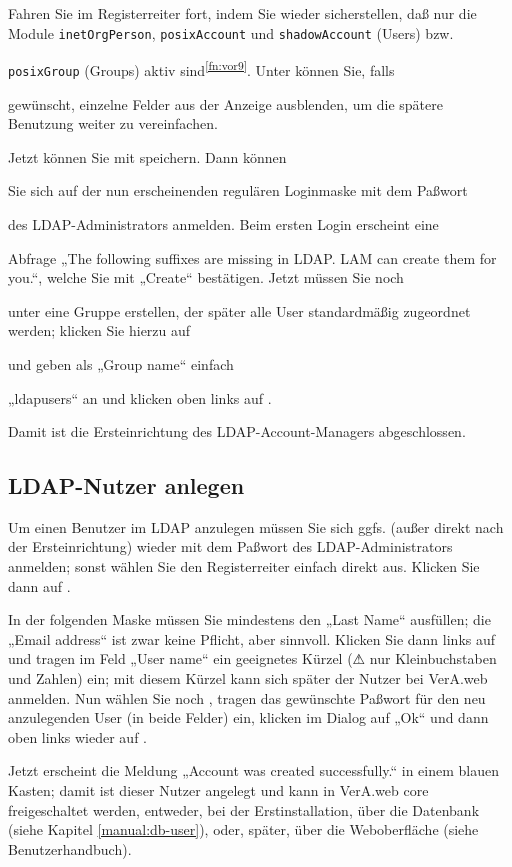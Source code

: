 \documentclass{tarentanleitung}
\begin{document}
\strut Fahren Sie im Registerreiter  fort,
indem Sie wieder sicherstellen, daß nur die Module \texttt{inetOrgPerson},
\texttt{posixAccount} und \texttt{shadowAccount} (Users) bzw.\strut
\texttt{posixGroup} (Groups) aktiv sind\Hair\textsuperscript{\ref{fn:vor9}}.
Unter  können Sie, falls\strut
gewünscht, einzelne Felder aus der Anzeige ausblenden, um die spätere
Benutzung weiter zu vereinfachen.\strut

Jetzt können Sie mit  speichern. Dann können\strut
Sie sich auf der nun erscheinenden regulären Loginmaske mit dem Paßwort\strut
des LDAP-Administrators anmelden. Beim ersten Login erscheint eine\strut
Abfrage „The following suffixes are missing in LDAP. LAM can create them
for you.“, welche Sie mit „Create“ bestätigen. Jetzt müssen Sie noch\strut
unter  eine Gruppe erstellen, der später
alle User standardmäßig zugeordnet werden; klicken Sie hierzu auf\strut
{} und geben als „Group name“ einfach\strut
„ldapusers“ an und klicken oben links auf .

Damit ist die Ersteinrichtung des LDAP-Account-Managers abgeschlossen.

\subsection{LDAP-Nutzer anlegen}\label{subsec:setup-lam-adduser}

Um einen Benutzer im LDAP anzulegen müssen Sie sich ggfs. (außer direkt
nach der Ersteinrichtung) wieder mit dem Paßwort des LDAP-Administrators
anmelden; sonst wählen Sie den Registerreiter 
einfach direkt aus. Klicken Sie dann auf .

In der folgenden Maske müssen Sie mindestens den „Last Name“ ausfüllen;
die „Email address“ ist zwar keine Pflicht, aber sinnvoll.
Klicken Sie dann links auf  und tragen im Feld
„User name“ ein geeignetes Kürzel (⚠ nur Kleinbuchstaben und Zahlen) ein;
mit diesem Kürzel kann sich später der Nutzer bei VerA.web anmelden. Nun
wählen Sie noch , tragen das gewünschte
Paßwort für den neu anzulegenden User (in beide Felder) ein, klicken im
Dialog auf „Ok“ und dann oben links wieder auf .

Jetzt erscheint die Meldung „Account was created successfully.“ in einem
blauen Kasten; damit ist dieser Nutzer angelegt und kann in VerA.web core
freigeschaltet werden, entweder, bei der Erstinstallation, über die
Datenbank (siehe Kapitel \ref{manual:db-user}), oder, später, über die
Weboberfläche (siehe Benutzerhandbuch).
\end{document}
